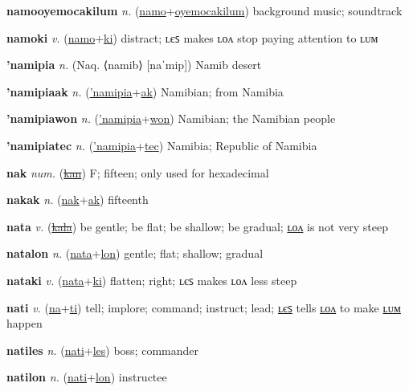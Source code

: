 \textbf{\hypertarget{namooyemocakilum}{namooyemocakilum}} \textit{n.} (\hyperlink{namo}{namo}+\allowbreak \hyperlink{oyemocakilum}{oyemocakilum})
background music; soundtrack

\textbf{\hypertarget{namoki}{namoki}} \textit{v.} (\hyperlink{namo}{namo}+\allowbreak \hyperlink{ki}{ki})
distract; ʟєꜱ makes ʟᴏᴧ stop paying attention to ʟᴜᴍ

\textbf{\hypertarget{'namipia}{'namipia}} \textit{n.} (Naq. ⟨namib⟩ [naˈmip])
Namib desert

\textbf{\hypertarget{'namipiaak}{'namipiaak}} \textit{n.} (\hyperlink{'namipia}{'namipia}+\allowbreak \hyperlink{ak}{ak})
Namibian; from Namibia

\textbf{\hypertarget{'namipiawon}{'namipiawon}} \textit{n.} (\hyperlink{'namipia}{'namipia}+\allowbreak \hyperlink{won}{won})
Namibian; the Namibian people

\textbf{\hypertarget{'namipiatec}{'namipiatec}} \textit{n.} (\hyperlink{'namipia}{'namipia}+\allowbreak \hyperlink{tec}{tec})
Namibia; Republic of Namibia

\textbf{\hypertarget{nak}{nak}} \textit{num.} (\hyperlink{kan}{\sout{kan}})
F; fifteen; only used for hexadecimal

\textbf{\hypertarget{nakak}{nakak}} \textit{n.} (\hyperlink{nak}{nak}+\allowbreak \hyperlink{ak}{ak})
fifteenth

\textbf{\hypertarget{nata}{nata}} \textit{v.} (\hyperlink{kala}{\sout{kala}})
be gentle; be flat; be shallow; be gradual; \hyperlink{natalon}{ʟᴏᴧ} is not very steep

\textbf{\hypertarget{natalon}{natalon}} \textit{n.} (\hyperlink{nata}{nata}+\allowbreak \hyperlink{lon}{lon})
gentle; flat; shallow; gradual

\textbf{\hypertarget{nataki}{nataki}} \textit{v.} (\hyperlink{nata}{nata}+\allowbreak \hyperlink{ki}{ki})
flatten; right; ʟєꜱ makes ʟᴏᴧ less steep

\textbf{\hypertarget{nati}{nati}} \textit{v.} (\hyperlink{na}{na}+\allowbreak \hyperlink{ti}{ti})
tell; implore; command; instruct; lead; \hyperlink{natiles}{ʟєꜱ} tells \hyperlink{natilon}{ʟᴏᴧ} to make \hyperlink{natilum}{ʟᴜᴍ} happen

\textbf{\hypertarget{natiles}{natiles}} \textit{n.} (\hyperlink{nati}{nati}+\allowbreak \hyperlink{les}{les})
boss; commander

\textbf{\hypertarget{natilon}{natilon}} \textit{n.} (\hyperlink{nati}{nati}+\allowbreak \hyperlink{lon}{lon})
instructee

